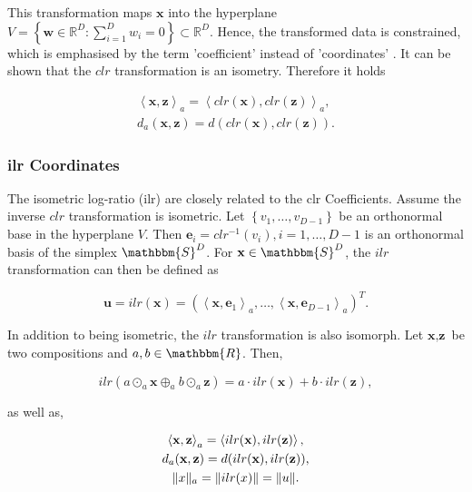 This transformation maps $\textbf{x}$ into the hyperplane $V = \left\{\textbf{w} \in \mathbb{R}^D: \sum_{i=1}^D w_i=0\right\} \subset \mathbb{R}^D$. Hence, the transformed data is constrained, which is emphasised by the term 'coefficient' instead of 'coordinates' \cite{Filzmoser:2020}. It can be shown that the $clr$ transformation is an isometry\cite{Egozcue:2003}. Therefore it holds 

\begin{gather}
\left\langle  \textbf{x},\textbf{z} \right\rangle_a = \left\langle  clr(\textbf{x}),clr(\textbf{z}) \right\rangle_a, \\
d_a(\textbf{x},\textbf{z}) = d(clr(\textbf{x}),clr(\textbf{z})).
\label{eq:clr Coefficients isometric}
\end{gather}

\subsubsection{ilr Coordinates}
\label{sec:ilr Coordinates}

The isometric log-ratio (ilr) are closely related to the clr Coefficients. Assume the inverse $clr$ transformation is isometric. Let $\left\{v_1,\ldots,v_{D-1}\right\}$ be an orthonormal base in the hyperplane $V$. Then $\textbf{e}_i = clr^{-1}(v_i), i=1,\ldots,D-1$ is an orthonormal basis of the simplex $\mathbbm{S}^D$. For $\textbf{x} \in \mathbbm{S}^D$, the $ilr$ transformation can then be defined as \cite{Kynclova:2015}

\begin{equation}
\textbf{u} = ilr(\textbf{x}) = \left(\left\langle \textbf{x},\textbf{e}_1\right\rangle_a,\ldots,\left\langle \textbf{x},\textbf{e}_{D-1}\right\rangle_a\right)^T.
\label{eq:ilr Coordinates}
\end{equation}

In addition to being isometric, the $ilr$ transformation is also isomorph. Let $\textbf{x}, \textbf{z}$ be two compositions and $a, b  \in \mathbbm{R}$. Then,

\begin{equation}
ilr(a \odot_a \textbf{x} \oplus_a b \odot_a \textbf{z}) = a \cdot ilr(\textbf{x}) + b \cdot ilr(\textbf{z}),
\label{eq:ilr coordinates isomorph}
\end{equation}

as well as,

\begin{gather}
\left\langle  \textbf{x},\textbf{z} \right\rangle_a = \left\langle  ilr(\textbf{x}), ilr(\textbf{z}) \right\rangle, \\
d_a(\textbf{x},\textbf{z}) = d(ilr(\textbf{x}),ilr(\textbf{z})),\\
\lVert x\rVert_a = \lVert ilr(x)\rVert = \lVert u\rVert.
\label{eq:ilr coordinates isometric }
\end{gather}


